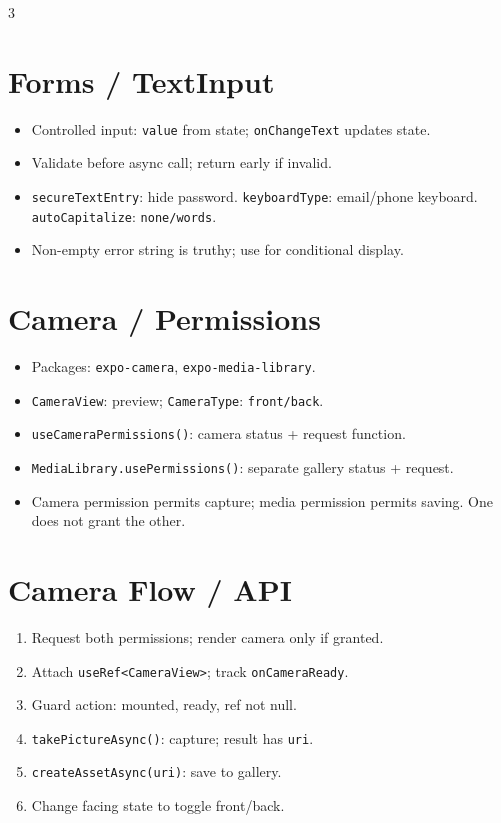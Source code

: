 \documentclass[10pt,a4paper]{article}
\begin{document}
\begin{multicols}{3}
\section*{Forms / TextInput}
\begin{itemize}
  \item Controlled input: \texttt{value} from state; \texttt{onChangeText} updates state.
  \item Validate before async call; return early if invalid.
  \item \texttt{secureTextEntry}: hide password. \texttt{keyboardType}: email/phone keyboard. \texttt{autoCapitalize}: \texttt{none/words}.
  \item Non-empty error string is truthy; use for conditional display.
\end{itemize}

\section*{Camera / Permissions}
\begin{itemize}
  \item Packages: \texttt{expo-camera}, \texttt{expo-media-library}.
  \item \texttt{CameraView}: preview; \texttt{CameraType}: \texttt{front/back}.
  \item \texttt{useCameraPermissions()}: camera status + request function.
  \item \texttt{MediaLibrary.usePermissions()}: separate gallery status + request.
  \item Camera permission permits capture; media permission permits saving. One does not grant the other.
\end{itemize}

\section*{Camera Flow / API}
\begin{enumerate}
  \item Request both permissions; render camera only if granted.
  \item Attach \texttt{useRef<CameraView>}; track \texttt{onCameraReady}.
  \item Guard action: mounted, ready, ref not null.
  \item \texttt{takePictureAsync()}: capture; result has \texttt{uri}.
  \item \texttt{createAssetAsync(uri)}: save to gallery.
  \item Change facing state to toggle front/back.
\end{enumerate}


\end{multicols}
\end{document}
